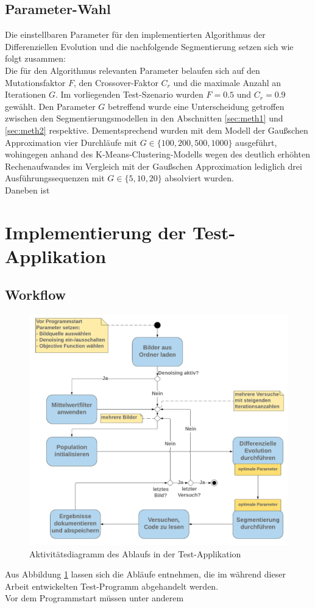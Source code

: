 		\subsection{Parameter-Wahl}
		\label{sub:de-params}
			Die einstellbaren Parameter für den implementierten Algorithmus der Differenziellen Evolution und die nachfolgende Segmentierung setzen sich wie folgt zusammen:\\
			Die für den Algorithmus relevanten Parameter belaufen sich auf den Mutationsfaktor $F$, den Crossover-Faktor $C_{r}$ und die maximale Anzahl an Iterationen $G$. Im vorliegenden Test-Szenario wurden $F = 0.5$ und $C_{r} = 0.9$ gewählt. Den Parameter $G$ betreffend wurde eine Unterscheidung getroffen zwischen den Segmentierungsmodellen in den Abschnitten \ref{sec:meth1} und \ref{sec:meth2} respektive. Dementsprechend wurden mit dem Modell der Gaußschen Approximation vier Durchläufe mit $G \in \{100, 200, 500, 1000\}$ ausgeführt, wohingegen anhand des K-Means-Clustering-Modells wegen des deutlich erhöhten Rechenaufwandes im Vergleich mit der Gaußschen Approximation lediglich drei Ausführungssequenzen mit $G \in \{5, 10, 20\}$ absolviert wurden.\\
			Daneben ist 

	\section{Implementierung der Test-Applikation}
	\label{sec:implementation}
		\subsection{Workflow}
		\label{sub:workflow}
			\begin{figure}[H]
				\centering
				\includegraphics[width=0.9\linewidth]{diff-evol-activity}
				\caption{Aktivitätsdiagramm des Ablaufs in der Test-Applikation}
				\label{fig:diff-evol-activity}
			\end{figure}
			Aus Abbildung \ref{fig:diff-evol-activity} lassen sich die Abläufe entnehmen, die im während dieser Arbeit entwickelten Test-Programm abgehandelt werden.\\
			Vor dem Programmstart müssen unter anderem 
	
